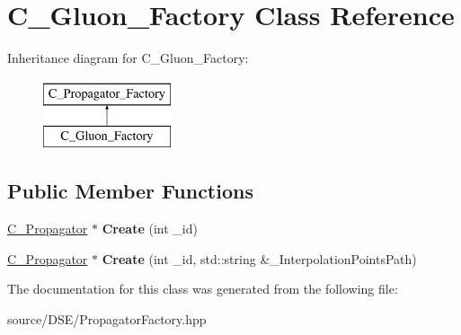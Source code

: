 \hypertarget{class_c___gluon___factory}{\section{C\-\_\-\-Gluon\-\_\-\-Factory Class Reference}
\label{class_c___gluon___factory}
}
Inheritance diagram for C\-\_\-\-Gluon\-\_\-\-Factory\-:\begin{figure}[H]
\begin{center}
\leavevmode
\includegraphics[height=2.000000cm]{class_c___gluon___factory}
\end{center}
\end{figure}
\subsection*{Public Member Functions}
\begin{DoxyCompactItemize}
\item 
\hypertarget{class_c___gluon___factory_a8c8da0ec99675366570f0ff44e390897}{\hyperlink{class_c___propagator}{C\-\_\-\-Propagator} $\ast$ {\bfseries Create} (int \-\_\-id)}\label{class_c___gluon___factory_a8c8da0ec99675366570f0ff44e390897}

\item 
\hypertarget{class_c___gluon___factory_a01429e9cb263d5c94b06cefae6b6cf5f}{\hyperlink{class_c___propagator}{C\-\_\-\-Propagator} $\ast$ {\bfseries Create} (int \-\_\-id, std\-::string \&\-\_\-\-Interpolation\-Points\-Path)}\label{class_c___gluon___factory_a01429e9cb263d5c94b06cefae6b6cf5f}

\end{DoxyCompactItemize}


The documentation for this class was generated from the following file\-:\begin{DoxyCompactItemize}
\item 
source/\-D\-S\-E/Propagator\-Factory.\-hpp\end{DoxyCompactItemize}

